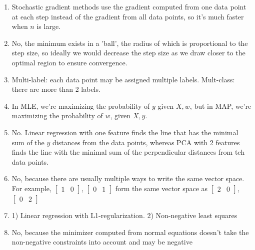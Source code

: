 \documentclass{article}
\def\enum#1{\begin{enumerate}#1\end{enumerate}}
\begin{document}
\enum{
\item Stochastic gradient methods use the gradient computed from one data point at each step instead of the gradient from all data points, so it's much faster when $n$ is large.
\item No, the minimum exists in a 'ball', the radius of which is proportional to the step size, so ideally we would decrease the step size as we draw closer to the optimal region to ensure convergence.
\item Multi-label: each data point may be assigned multiple labels. Mult-class: there are more than 2 labels.
\item In MLE, we're maximizing the probability of $y$ given $X, w$, but in MAP, we're maximizing the probability of $w$, given $X, y$.
\item No. Linear regression with one feature finds the line that has the minimal sum of the $y$ distances from the data points, whereas PCA with 2 features finds the line with the minimal sum of the perpendicular distances from teh data points.
\item No, because there are usually multiple ways to write the same vector space. For example, $\begin{bmatrix}1 & 0\end{bmatrix}$, $\begin{bmatrix}0 & 1\end{bmatrix}$ form the same vector space as $\begin{bmatrix}2 & 0\end{bmatrix}$, $\begin{bmatrix}0 & 2\end{bmatrix}$
\item 1) Linear regression with L1-regularization. 2) Non-negative least squares
\item No, because the minimizer computed from normal equations doesn't take the non-negative constraints into account and may be negative
}
\end{document}
